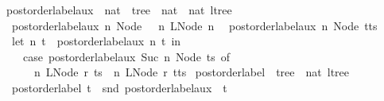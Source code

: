 \begin{isabellebody}
\ postorder{\isacharunderscore}{\kern0pt}label{\isacharunderscore}{\kern0pt}aux\ {\isacharcolon}{\kern0pt}{\isacharcolon}{\kern0pt}\ {\isachardoublequoteopen}nat\ {\isasymRightarrow}\ tree\ {\isasymRightarrow}\ nat\ {\isasymtimes}\ nat\ ltree{\isachardoublequoteclose}\ \isanewline
\ \ {\isachardoublequoteopen}postorder{\isacharunderscore}{\kern0pt}label{\isacharunderscore}{\kern0pt}aux\ n\ {\isacharparenleft}{\kern0pt}Node\ {\isacharbrackleft}{\kern0pt}{\isacharbrackright}{\kern0pt}{\isacharparenright}{\kern0pt}\ {\isacharequal}{\kern0pt}\ {\isacharparenleft}{\kern0pt}n{\isacharcomma}{\kern0pt}\ LNode\ n\ {\isacharbrackleft}{\kern0pt}{\isacharbrackright}{\kern0pt}{\isacharparenright}{\kern0pt}{\isachardoublequoteclose}\isanewline
{\isacharbar}{\kern0pt}\ {\isachardoublequoteopen}postorder{\isacharunderscore}{\kern0pt}label{\isacharunderscore}{\kern0pt}aux\ n\ {\isacharparenleft}{\kern0pt}Node\ {\isacharparenleft}{\kern0pt}t{\isacharhash}{\kern0pt}ts{\isacharparenright}{\kern0pt}{\isacharparenright}{\kern0pt}\ {\isacharequal}{\kern0pt}\isanewline
\ \ {\isacharparenleft}{\kern0pt}let\ {\isacharparenleft}{\kern0pt}n{\isacharprime}{\kern0pt}{\isacharcomma}{\kern0pt}\ t{\isacharprime}{\kern0pt}{\isacharparenright}{\kern0pt}\ {\isacharequal}{\kern0pt}\ postorder{\isacharunderscore}{\kern0pt}label{\isacharunderscore}{\kern0pt}aux\ n\ t\ in\isanewline
\ \ \ \ case\ postorder{\isacharunderscore}{\kern0pt}label{\isacharunderscore}{\kern0pt}aux\ {\isacharparenleft}{\kern0pt}Suc\ n{\isacharprime}{\kern0pt}{\isacharparenright}{\kern0pt}\ {\isacharparenleft}{\kern0pt}Node\ ts{\isacharparenright}{\kern0pt}\ of\isanewline
\ \ \ \ \ \ {\isacharparenleft}{\kern0pt}n{\isacharprime}{\kern0pt}{\isacharprime}{\kern0pt}{\isacharcomma}{\kern0pt}\ LNode\ r\ ts{\isacharprime}{\kern0pt}{\isacharparenright}{\kern0pt}\ {\isasymRightarrow}\ {\isacharparenleft}{\kern0pt}n{\isacharprime}{\kern0pt}{\isacharprime}{\kern0pt}{\isacharcomma}{\kern0pt}\ LNode\ r\ {\isacharparenleft}{\kern0pt}t{\isacharprime}{\kern0pt}{\isacharhash}{\kern0pt}ts{\isacharprime}{\kern0pt}{\isacharparenright}{\kern0pt}{\isacharparenright}{\kern0pt}{\isacharparenright}{\kern0pt}{\isachardoublequoteclose}\isanewline
\isanewline
{}\isamarkupfalse%
\ postorder{\isacharunderscore}{\kern0pt}label\ {\isacharcolon}{\kern0pt}{\isacharcolon}{\kern0pt}\ {\isachardoublequoteopen}tree\ {\isasymRightarrow}\ nat\ ltree{\isachardoublequoteclose}\ \isanewline
\ \ {\isachardoublequoteopen}postorder{\isacharunderscore}{\kern0pt}label\ t\ {\isacharequal}{\kern0pt}\ snd\ {\isacharparenleft}{\kern0pt}postorder{\isacharunderscore}{\kern0pt}label{\isacharunderscore}{\kern0pt}aux\ {}\ t{\isacharparenright}{\kern0pt}{\isachardoublequoteclose}\isanewline

\end{isabellebody}
